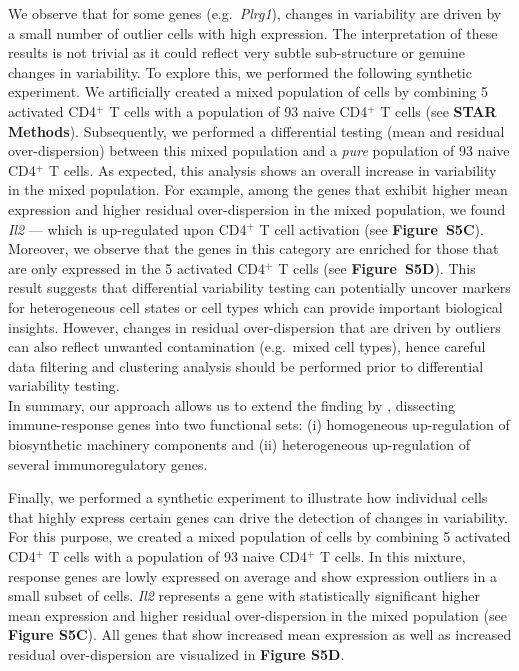 We observe that for some genes (e.g.~\textit{Plrg1}), changes in variability are driven by a small number of outlier cells with high expression. The interpretation of these results is not trivial as it could reflect very subtle sub-structure or genuine changes in variability. To explore this, we performed the following synthetic experiment. We artificially created a mixed population of cells by combining 5 activated CD4$^+$ T cells with a population of 93 naive CD4$^+$ T cells (see \textbf{STAR Methods}). Subsequently, we performed a differential testing (mean and residual over-dispersion) between this mixed population and a \textit{pure} population of 93 naive CD4$^+$ T cells. As expected, this analysis shows an overall increase in variability in the mixed population. For example, among the genes that exhibit higher mean expression and higher residual over-dispersion in the mixed population, we found \textit{Il2} --- which is up-regulated upon CD4$^+$ T cell activation (see \textbf{Figure~S5C}). Moreover, we observe that the genes in this category are enriched for those that are only expressed in the 5 activated CD4$^+$ T cells (see \textbf{Figure~S5D}). This result suggests that differential variability testing can potentially uncover markers for heterogeneous cell states or cell types which can provide important biological insights. However, changes in residual over-dispersion that are driven by outliers can also reflect unwanted contamination 
(e.g.~mixed cell types), hence careful data filtering and clustering analysis should be performed prior to differential variability testing. \\

In summary, our approach allows us to extend the finding by \cite{Martinez-jimenez2017}, dissecting immune-response genes into two functional sets: (i) homogeneous up-regulation of biosynthetic machinery components and (ii) heterogeneous up-regulation of several immunoregulatory genes.



Finally, we performed a synthetic experiment to illustrate how individual cells that highly express certain genes can drive the detection of changes in variability. For this purpose, we created a mixed population of cells by combining 5 activated CD4$^+$ T cells with a population of 93 naive CD4$^+$ T cells. In this mixture, response genes are lowly expressed on average and show expression outliers in a small subset of cells. \textit{Il2} represents a gene with statistically significant higher mean expression and higher residual over-dispersion in the mixed population (see \textbf{Figure S5C}). All genes that show increased mean expression as well as increased residual over-dispersion are visualized in \textbf{Figure S5D}.\\
